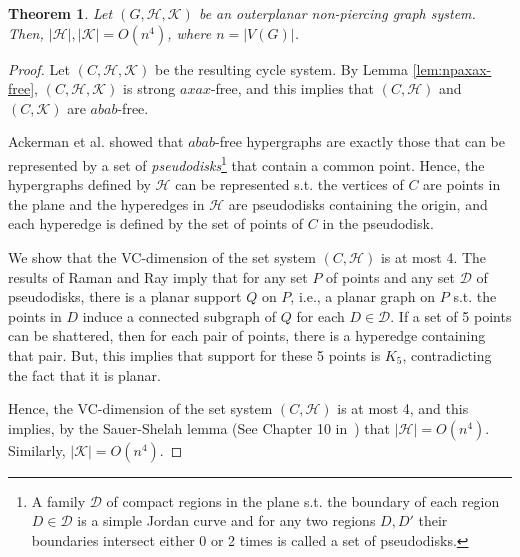 \documentclass[12pt]{article}
\newcommand{\HH}{\mathcal{H}}
\newcommand{\KK}{\mathcal{K}}
\newtheorem{theorem}{Theorem}
\theoremstyle{case}
\begin{document}
\begin{theorem}
\label{thm:vcdim}
Let $(G,\mathcal{H},\mathcal{K})$ be an outerplanar non-piercing graph system.
Then, $|\mathcal{H}|,|\mathcal{K}|=O(n^4)$, where $n=|V(G)|$.
\end{theorem}
\begin{proof}
Let $(C,\HH,\KK)$ be the resulting cycle system.
By Lemma \ref{lem:npaxax-free}, $(C,\mathcal{H},\mathcal{K})$
is strong $axax$-free, and this implies that $(C,\mathcal{H})$
and $(C,\mathcal{K})$ are $abab$-free.

Ackerman et al. \cite{ackerman2020coloring} showed
that $abab$-free hypergraphs are exactly those that can be
represented by a set of \emph{pseudodisks}\footnote{A family $\mathcal{D}$ of compact regions in the plane s.t. the boundary of each region $D\in\mathcal{D}$ is a simple Jordan curve and for any two regions $D, D'$ their boundaries intersect either $0$ or 2 times
is called a set of pseudodisks.} that contain a common point. 
Hence, the hypergraphs defined by $\mathcal{H}$
can be represented s.t. the vertices of $C$ are points in the plane and
the hyperedges in $\mathcal{H}$ are pseudodisks containing the
origin, and each hyperedge is defined by the set of points of $C$
in the pseudodisk.

We show that the VC-dimension of the set system $(C,\HH)$ is at most 4.
The results of Raman and Ray \cite{RR18} imply that for any set
$P$ of points and any set $\mathcal{D}$ of pseudodisks, there
is a planar support $Q$ on $P$, i.e., a planar graph on $P$ s.t.
the points in $D$ induce a connected subgraph of $Q$ for each
$D\in\mathcal{D}$.
If a set of 5 points can be shattered, then for each pair of points,
there is a hyperedge containing that pair. But, this implies that support for these 5 points is $K_5$, contradicting the fact that it is planar.

Hence, the VC-dimension of the set system $(C,\mathcal{H})$ is
at most 4, and this implies, by the Sauer-Shelah lemma (See Chapter 10 in~\cite{Mat02LecDiscGeom})
that $|\mathcal{H}|=O(n^4)$.
Similarly, $|\mathcal{K}|=O(n^4)$.
\end{proof}
\end{document}
